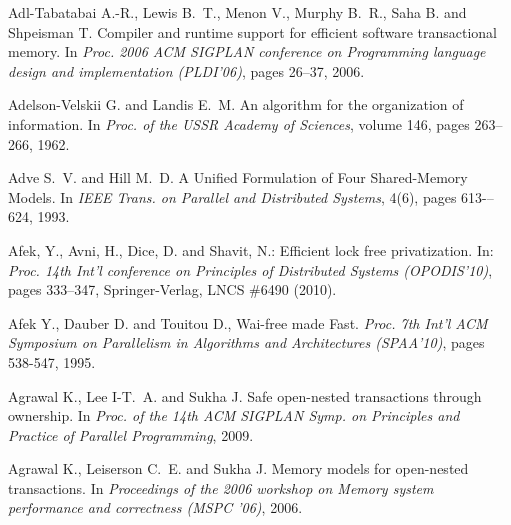 \begin{thebibliography}{99}
\small{




Adl-Tabatabai A.-R., Lewis B.~T., Menon V., Murphy B.~R., 
  Saha B. and Shpeisman T.
\newblock Compiler and runtime support for efficient software transactional
  memory.
\newblock In {\em Proc. 2006 ACM SIGPLAN conference on
  Programming language design and implementation (PLDI'06)}, pages 26--37, 2006.



Adelson-Velskii G. and Landis E.~M.
\newblock An algorithm for the organization of information.
\newblock In {\em Proc. of the USSR Academy of Sciences}, volume 146, pages
  263--266, 1962.


Adve S.~V. and Hill M.~D.
\newblock A Unified Formulation of Four Shared-Memory Models.
\newblock In {\em IEEE Trans. on Parallel and Distributed Systems}, 4(6), pages 613-–624, 1993.


 Afek, Y.,  Avni, H.,   Dice, D. and  Shavit, N.: Efficient lock free privatization. 
In: {\it Proc.  14th Int'l conference on Principles of Distributed Systems 
(OPODIS'10)}, pages 333--347, Springer-Verlag,  LNCS \#6490 (2010).



Afek Y., Dauber D. and Touitou D.,
Wai-free made Fast. 
{\it Proc. 7th  Int'l  ACM Symposium on Parallelism in Algorithms 
and Architectures   (SPAA'10)},  pages 538-547,  1995. 






Agrawal K., Lee I-T.~A. and Sukha J.
\newblock Safe open-nested transactions through ownership.
\newblock In {\em Proc. of the 14th ACM SIGPLAN Symp. on Principles and
  Practice of Parallel Programming}, 2009.

Agrawal K., Leiserson C.~E. and Sukha J.
\newblock Memory models for open-nested transactions.
\newblock In {\em Proceedings of the 2006 workshop on Memory system
  performance and correctness (MSPC '06)}, 2006.


}
\end{thebibliography}
